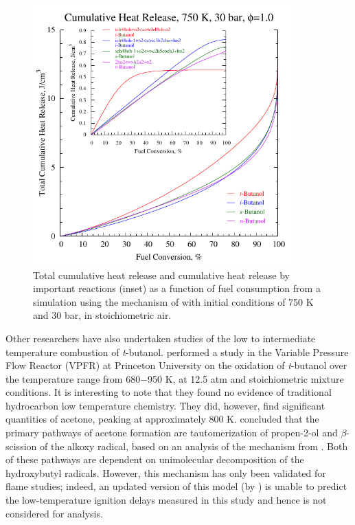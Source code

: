 \documentclass[12pt, letterpaper]{article}
\begin{document}
\begin{figure}
    \centering
    \includegraphics[width=10cm]{03-Butanol/buoh-heat}
    \caption{Total cumulative heat release and cumulative heat release by 
    important reactions (inset) as a function of fuel consumption from a 
    simulation using the mechanism of \textcite{Sarathy2012} with initial 
    conditions of 750 K and 30 bar, in stoichiometric air.}
    \label{fig:buoh-heat}
\end{figure}

Other researchers have also undertaken studies of the low to intermediate
temperature combustion of \textit{t}-butanol. \textcite{Lefkowitz2012}
performed a study in the Variable Pressure Flow Reactor (VPFR) at Princeton
University on the oxidation of \textit{t}-butanol over the temperature range
from 680−950 K, at 12.5 atm and stoichiometric mixture conditions. It is
interesting to note that they found no evidence of traditional hydrocarbon
low temperature chemistry. They did, however, find significant quantities of
acetone, peaking at approximately 800 K. \textcite{Lefkowitz2012} concluded
that the primary pathways of acetone formation are tautomerization of
propen-2-ol and $\beta$-scission of the alkoxy radical, based on an analysis
of the mechanism from \textcite{Grana2010}. Both of these pathways are
dependent on unimolecular decomposition of the hydroxybutyl radicals. However,
this mechanism has only been validated for flame studies; indeed, an updated
version of this model (by \textcite{Frassoldati2012}) is unable to predict the
low-temperature ignition delays measured in this study and hence is not
considered for analysis.
\end{document}
